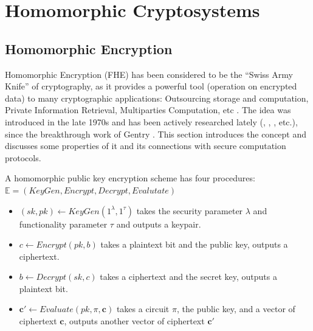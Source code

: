 
\section{Homomorphic Cryptosystems}
\label{sec:defHomo}

\subsection{Homomorphic Encryption}
Homomorphic Encryption (FHE) has been considered to be the ``Swiss Army Knife''
of cryptography, as it provides a powerful tool (operation on encrypted data) to
many cryptographic applications: Outsourcing storage and computation, Private
Information Retrieval, Multiparties Computation, etc . The idea was introduced
in the late 1970s \cite{rivest1978data} and has been actively researched lately
(\cite{smart2014fully}, \cite{van2010fully} , \cite{stehle2010faster}
\cite{gentry2013homomorphic}, etc.), since the breakthrough work of Gentry
\cite{homenc}. This section introduces the concept and discusses some properties of it
and its connections with secure computation protocols.

\begin{definition}
  [Syntax]A homomorphic public key encryption scheme has four procedures:
  \(\mathbb{E} = (KeyGen, Encrypt, Decrypt, Evalutate)\)
  \begin{itemize}
  \item \((sk,pk) \gets KeyGen(1^{\lambda},1^{\tau})\) takes the security
    parameter \(\lambda\) and functionality parameter \(\tau\) and outputs a
    keypair.
  \item \(c \gets Encrypt(pk, b)\) takes a plaintext bit and the public key,
    outputs a ciphertext.
  \item \(b \gets Decrypt(sk, c)\) takes a ciphertext and the secret key,
    outputs a plaintext bit.
  \item \(\mathbf{c}' \gets Evaluate(pk, \pi, \mathbf{c})\) takes a circuit
    \(\pi\), the public key, and a vector of ciphertext \(\mathbf{c}\), outputs
    another vector of ciphertext \(\mathbf{c}'\)
  \end{itemize}
\end{definition}

